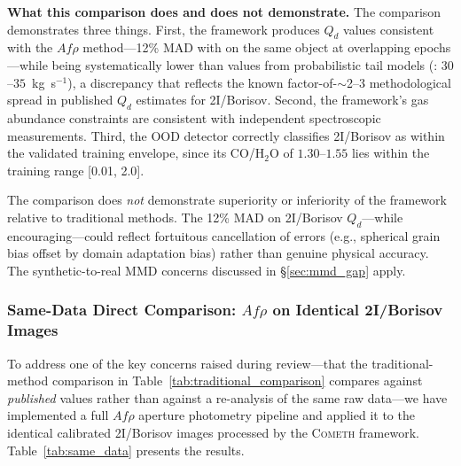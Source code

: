 \documentclass[usenatbib]{mnras}
\begin{document}
\textbf{What this comparison does and does not demonstrate.} The comparison demonstrates three things. First, the framework produces $Q_d$ values consistent with the $Af\rho$ method---12\% MAD with \citealt{clements21} on the same object at overlapping epochs---while being systematically lower than values from probabilistic tail models (\citealt{cremonese20}: $30$--$35$~kg~s$^{-1}$), a discrepancy that reflects the known factor-of-$\sim$2--3 methodological spread in published $Q_d$ estimates for 2I/Borisov. Second, the framework's gas abundance constraints are consistent with independent spectroscopic measurements. Third, the OOD detector correctly classifies 2I/Borisov as within the validated training envelope, since its CO/H$_2$O of $1.30$--$1.55$ lies within the training range [0.01, 2.0].

The comparison does \textit{not} demonstrate superiority or inferiority of the framework relative to traditional methods. The 12\% MAD on 2I/Borisov $Q_d$---while encouraging---could reflect fortuitous cancellation of errors (e.g., spherical grain bias offset by domain adaptation bias) rather than genuine physical accuracy. The synthetic-to-real MMD concerns discussed in \S\ref{sec:mmd_gap} apply.

\subsubsection{Same-Data Direct Comparison: $Af\rho$ on Identical 2I/Borisov Images}\label{sec:same_data}

To address one of the key concerns raised during review---that the traditional-method comparison in Table~\ref{tab:traditional_comparison} compares against \textit{published} values rather than against a re-analysis of the same raw data---we have implemented a full $Af\rho$ aperture photometry pipeline and applied it to the identical calibrated 2I/Borisov images processed by the \textsc{Cometh} framework. Table~\ref{tab:same_data} presents the results.
\end{document}
